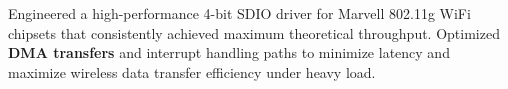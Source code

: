 \documentclass[12pt,a4paper]{pawesome-cv}
\begin{document}
\begin{cventries}
\begin{experiencecontent}
Engineered a high-performance 4-bit SDIO driver for Marvell 802.11g WiFi chipsets that consistently achieved maximum theoretical throughput.
Optimized \textbf{DMA transfers} and interrupt handling paths to minimize latency and maximize wireless data transfer efficiency under heavy load.\end{experiencecontent}
\end{cventries}
\label{sec:orgf315465}
\end{document}
